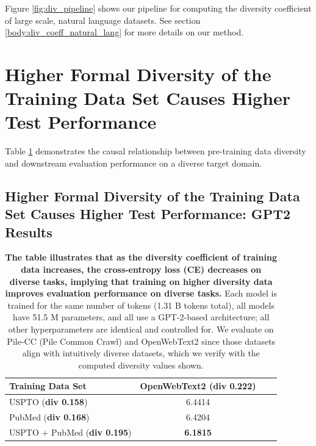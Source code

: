Figure \ref{fig:div_pipeline} shows our pipeline for computing the diversity coefficient of large scale, natural language datasets. See section \ref{body:div_coeff_natural_lang} for more details on our method.

\section{Higher Formal Diversity of the Training Data Set Causes Higher Test Performance}
Table \ref{tab:div_vs_ppl} demonstrates the causal relationship between pre-training data diversity and downstream evaluation performance on a diverse target domain. 

\subsection{Higher Formal Diversity of the Training Data Set Causes Higher Test Performance: GPT2 Results}

\begin{table}[h!]
    \centering
    \caption{\textbf{The table illustrates that as the diversity coefficient of training data increases, the cross-entropy loss (CE) decreases on diverse tasks, implying that training on higher diversity data improves evaluation performance on diverse tasks.} 
    Each model is trained for the same number of tokens (1.31 B tokens total), 
    all models have 51.5 M parameters, and all use a GPT-2-based architecture; all other hyperparameters are identical and controlled for.
    We evaluate on Pile-CC (Pile Common Crawl) and OpenWebText2 since those datasets align with intuitively diverse datasets, which we verify with the computed diversity values shown.
    }
    \vspace{10pt}
    \begin{tabular}{lccc}
        \toprule
        Training Data Set & OpenWebText2 (\textbf{div 0.222}) \\
        \midrule
        USPTO (\textbf{div 0.158}) & 6.4414 \\
        PubMed (\textbf{div 0.168})  & 6.4204 \\
        USPTO + PubMed (\textbf{div 0.195}) & \textbf{6.1815} \\
        \bottomrule
    \end{tabular}
    \label{tab:div_vs_ppl}
\end{table}

